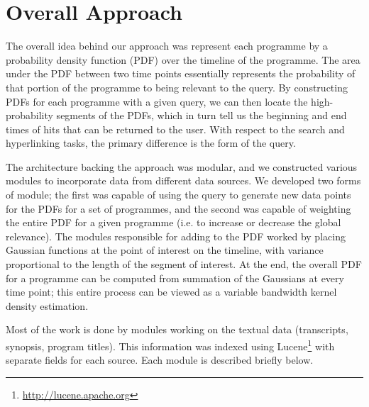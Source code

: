 \documentclass{../acm_proc_article-me11_tweaked}
\begin{document}
\section{Overall Approach}
The overall idea behind our approach was represent each programme by a probability density function (PDF) over the timeline of the programme. The area under the PDF between two time points essentially represents the probability of that portion of the programme to being relevant to the query. By constructing PDFs for each programme with a given query, we can then locate the high-probability segments of the PDFs, which in turn tell us the beginning and end times of hits that can be returned to the user. With respect to the search and hyperlinking tasks, the primary difference is the form of the query.

The architecture backing the approach was modular, and we constructed various modules to incorporate data from different data sources. We developed two forms of module; the first was capable of using the query to generate new data points for the PDFs for a set of programmes, and the second was capable of weighting the entire PDF for a given programme (i.e. to increase or decrease the global relevance). The modules responsible for adding to the PDF worked by placing Gaussian functions at the point of interest on the timeline, with variance proportional to the length of the segment of interest. At the end, the overall PDF for a programme can be computed from summation of the Gaussians at every time point; this entire process can be viewed as a variable bandwidth kernel density estimation. 

Most of the work is done by modules working on the textual data (transcripts, synopsis, program titles). This information was indexed using Lucene\footnote{\url{http://lucene.apache.org}} with separate fields for each source. Each module is described briefly below.
\end{document}
